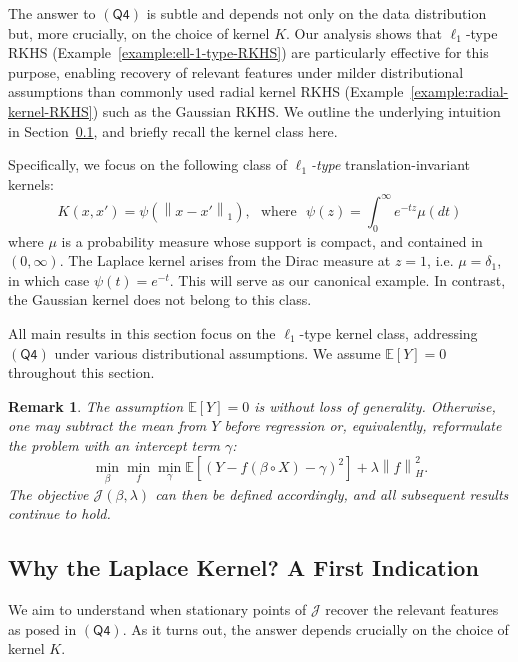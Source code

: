 \documentclass[sn-mathphys-num]{sn-jnl}%
\numberwithin{equation}{section}
\newcommand{\E}{\mathbb{E}}
\newcommand{\kernel}{K}
\newcommand{\norm}[1]{\left\|{#1}\right\|} %
\newcommand{\profile}{\psi}
\theoremstyle{thmstyleone}%
\theoremstyle{thmstyletwo}%
\newtheorem{remark}{Remark}%
\theoremstyle{thmstylethree}%
\begin{document}
\vspace{.5em}
The answer to $(\mathsf{Q4})$ is subtle and depends not only on the data distribution but, more crucially, on the choice of kernel $\kernel$. %
Our analysis shows that $\ell_1$-type RKHS (Example~\ref{example:ell-1-type-RKHS}) are particularly effective for this purpose, enabling recovery of relevant features under milder distributional assumptions than commonly used radial kernel RKHS (Example~\ref{example:radial-kernel-RKHS}) such as the Gaussian RKHS. We outline the underlying intuition in Section~\ref{sec:laplace-kernel-why}, and briefly recall the kernel class here.

Specifically, we focus on the following class of \emph{$\ell_1$-type} translation-invariant kernels:
\begin{equation}
\label{eqn:choice-of-ell-one-kernels}
	\kernel(x, x') = \profile( \norm{x-x'}_1),~~~\text{where}~~~\profile(z) = \int_0^\infty e^{-tz} \mu(dt)
\end{equation} 
where $\mu$ is a probability measure whose support is compact, and contained in $(0, \infty)$. The Laplace kernel arises from the Dirac measure at $z=1$, i.e. $\mu = \delta_1$, in which case $\profile(t) = e^{-t}$. This will serve as our canonical example. 
In contrast, the Gaussian kernel does not belong to this class.

All main results in this section focus on the $\ell_1$-type kernel class, addressing $(\mathsf{Q4})$ under various distributional assumptions. We assume $\E[Y] = 0$ throughout this section.

\vspace{.5em} 
\begin{remark} 
\emph{The assumption $\E[Y] = 0$ is without loss of generality. Otherwise, one may subtract the mean from $Y$ before regression or, equivalently, reformulate the problem with an intercept term $\gamma$: 
\begin{equation*}
	\min_\beta \min_f \min_\gamma \E[(Y -f(\beta \circ X) - \gamma)^2] + \lambda \norm{f}_H^2.
\end{equation*}
The objective $\mathcal{J}(\beta, \lambda)$ can then be defined accordingly, and all subsequent results continue to hold.
}
\end{remark} 

\subsection{Why the Laplace Kernel? A First Indication} 
\label{sec:laplace-kernel-why}
We aim to understand when stationary points of $\mathcal{J}$ recover the relevant features as posed in $(\mathsf{Q4})$.  As it turns out, the answer depends crucially on the choice of kernel $\kernel$. %
\end{document}

